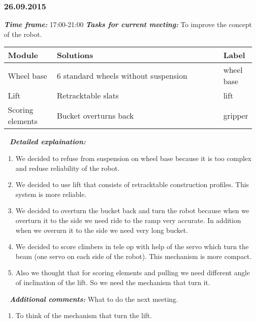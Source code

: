 \subsubsection{26.09.2015}
	\textit{\textbf{Time frame:}} 17:00-21:00 \newline \newline
	\textit{\textbf{Tasks for current meeting:}} To improve the concept of the robot.

  \begin{table}[H]
	\vspace{-2mm}
	\begin{center}
		\begin{tabular}{|p{0.2\linewidth}|p{0.7\linewidth}|p{0.1\linewidth}|}
			\hline
			Module & Solutions & Label \\
			\hline
			Wheel base & 6 standard wheels without suspension & wheel base \\
			\hline
			Lift & Retracktable slats & lift \\
			\hline
			Scoring elements & Bucket overturns back & gripper \\
			\hline
		\end{tabular}
	\end{center}
  \end{table}
  
   \newline
  \textit{\textbf{Detailed explaination:}}
  \begin{enumerate}
  	\item We decided to refuse from suspension on wheel base because it is too complex and reduse reliability of the robot.
  	
  	\item We decided to use lift that consists of retracktable construction profiles. This system is more reliable.
  	
  	\item We decided to overturn the bucket back and turn the robot because when we overturn it to the side we need ride to the ramp very accurate. In addition when we overurn it to the side we need very long bucket. 
  	
  	\item We decided to score climbers in tele op with help of the servo which turn the beam (one servo on each side of the robot). This mechanism is more compact.
  	
  	\item Also we thought that for scoring elements and pulling we need different angle of inclination of the lift. So we need the mechanism that turn it.
  	
  \end{enumerate}
  
   \newline
  \textit{\textbf{Additional comments:}} What to do the next meeting.
  \begin{enumerate}
  	\item To think of the mechanism that turn the lift.
  \end{enumerate}
  
    \newline

\fillpage
